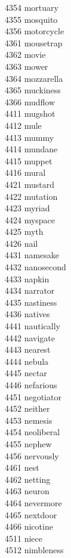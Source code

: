 4354 mortuary \\
4355 mosquito \\
4356 motorcycle \\
4361 mousetrap \\
4362 movie \\
4363 mower \\
4364 mozzarella \\
4365 muckiness \\
4366 mudflow \\
4411 mugshot \\
4412 mule \\
4413 mummy \\
4414 mundane \\
4415 muppet \\
4416 mural \\
4421 mustard \\
4422 mutation \\
4423 myriad \\
4424 myspace \\
4425 myth \\
4426 nail \\
4431 namesake \\
4432 nanosecond \\
4433 napkin \\
4434 narrator \\
4435 nastiness \\
4436 natives \\
4441 nautically \\
4442 navigate \\
4443 nearest \\
4444 nebula \\
4445 nectar \\
4446 nefarious \\
4451 negotiator \\
4452 neither \\
4453 nemesis \\
4454 neoliberal \\
4455 nephew \\
4456 nervously \\
4461 nest \\
4462 netting \\
4463 neuron \\
4464 nevermore \\
4465 nextdoor \\
4466 nicotine \\
4511 niece \\
4512 nimbleness \\
